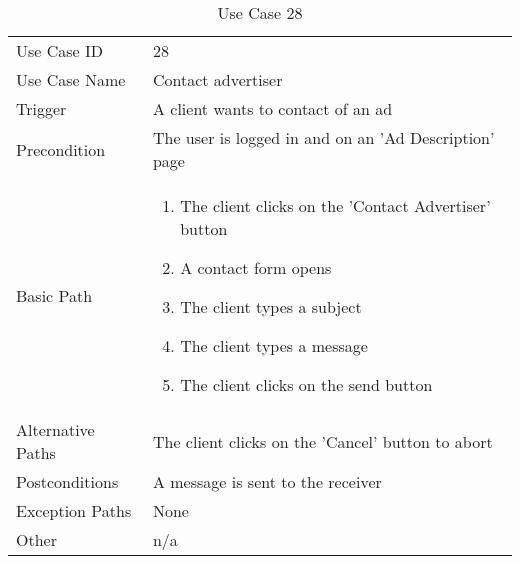 \begin{table}[H]
\centering
\label{table-use-case-28}
\begin{tabular}{|p{3cm}|p{10cm}}
Use Case ID       & 28                                                           
\\
Use Case Name     & Contact advertiser                                                         
\\
Trigger           & A client wants to contact of an ad                                          
\\
Precondition      & The user is logged in and on an 'Ad Description' page                                                
\\
Basic Path        & \begin{enumerate}
\item The client clicks on the 'Contact Advertiser' button
\item A contact form opens
\item The client types a subject
\item The client types a message
\item The client clicks on the send button
\end{enumerate} 
     \\
Alternative Paths & The client clicks on the 'Cancel' button to abort                        
\\
Postconditions    & A message is sent to the receiver
\\
Exception Paths   & None                          \\
Other             & n/a                                                                                                                                                                                                        
\end{tabular}
\caption{Use Case 28}
\end{table}

